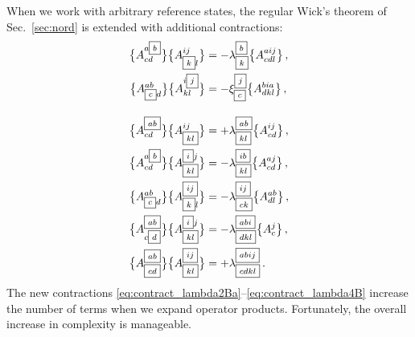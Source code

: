 When we work with arbitrary reference states, the regular Wick's 
theorem of Sec.~\ref{sec:nord} is extended with additional contractions:
{\setlength{\fboxsep}{1pt}
\begin{align}
  \nord{A^{a{\fbox{\scriptsize $b$}}}_{cd}}\nord{A^{ij}_{\fbox{\scriptsize $k$}l}} &= - \lambda^{\fbox{\scriptsize $b$}}_{\fbox{\scriptsize $k$}}\nord{A^{aij}_{cdl}}\,,\label{eq:contract_lambda1B}\\ 
  \nord{A^{ab}_{\fbox{\scriptsize $c$}d}}\nord{A^{i\fbox{\scriptsize $j$}}_{kl}} &= - \xi^{\fbox{\scriptsize $j$}}_{\fbox{\scriptsize $c$}}\nord{A^{bia}_{dkl}}\,,\label{eq:contract_chi1B}\\[10pt]
  \nord{A^{\fbox{\scriptsize $ab$}}_{cd}}\nord{A^{ij}_{\fbox{\scriptsize $kl$}}} &= + \lambda^{\fbox{\scriptsize $ab$}}_{\fbox{\scriptsize $kl$}}\nord{A^{ij}_{cd}}\,,\label{eq:contract_lambda2Ba}\\ 
  \nord{A^{a{\fbox{\scriptsize $b$}}}_{cd}}\nord{A^{\fbox{\scriptsize $i$}j}_{\fbox{\scriptsize $kl$}}} &= - \lambda^{\fbox{\scriptsize $ib$}}_{\fbox{\scriptsize $kl$}}\nord{A^{aj}_{cd}}\,,\label{eq:contract_lambda2Bb}\\ 
  \nord{A^{ab}_{\fbox{\scriptsize $c$}d}}\nord{A^{\fbox{\scriptsize $ij$}}_{\fbox{\scriptsize $k$}l}} &= - \lambda^{\fbox{\scriptsize $ij$}}_{\fbox{\scriptsize $ck$}}\nord{A^{ab}_{dl}}\,,\label{eq:contract_lambda2Bc}\\ 
  \nord{A^{\fbox{\scriptsize $ab$}}_{c\fbox{\scriptsize$d$}}}\nord{A^{\fbox{\scriptsize $i$}j}_{\fbox{\scriptsize $kl$}}} &= - \lambda^{\fbox{\scriptsize $abi$}}_{\fbox{\scriptsize $dkl$}}\nord{A^{j}_{c}}\,,\label{eq:contract_lambda3B}\\ 
  \nord{A^{\fbox{\scriptsize $ab$}}_{\fbox{\scriptsize$cd$}}}\nord{A^{\fbox{\scriptsize $ij$}}_{\fbox{\scriptsize $kl$}}} &= +\lambda^{\fbox{\scriptsize $abij$}}_{\fbox{\scriptsize $cdkl$}}\,.\label{eq:contract_lambda4B}
\end{align}
}
The new contractions \eqref{eq:contract_lambda2Ba}--\eqref{eq:contract_lambda4B} 
increase the number of terms when we expand operator products. Fortunately,
the overall increase in complexity is manageable.

